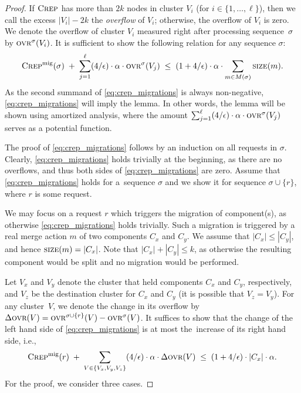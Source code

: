 \begin{proof}
If $\textsc{Crep}$ has more than $2 k$ nodes in cluster $V_i$ (for $i \in
\{1,\ldots,\ell\}$), then we call the excess $|V_i| - 2 k$ the \emph{overflow} of $V_i$;
otherwise, the overflow of $V_i$ is zero. We denote the overflow of cluster
$V_i$ measured right after processing sequence~$\sigma$ by $\textsc{ovr}^\sigma(V_i)$.
It is sufficient to show the following relation for any sequence $\sigma$:
\begin{equation}
\label{eq:crep_migrations}
 \textsc{Crep}^\textnormal{mig}(\sigma) \;+\; \sum_{j=1}^\ell (4/\epsilon) \cdot \alpha \cdot \textsc{ovr}^\sigma(V_j) 
 \; \leq \; (1+4/\epsilon)  \cdot \alpha \cdot \sum_{m \in M(\sigma)} \textsc{size}(m).
\end{equation}
As the second summand of \eqref{eq:crep_migrations} is always non-negative,
\eqref{eq:crep_migrations} will imply the lemma. 
In other words, the lemma will be shown using amortized analysis, where
the amount $\sum_{j=1}^\ell (4/\epsilon) \cdot \alpha \cdot \textsc{ovr}^\sigma(V_j)$ serves 
as a potential function.

The proof of \eqref{eq:crep_migrations} follows by an induction on all
requests in $\sigma$. Clearly, \eqref{eq:crep_migrations} holds trivially at the
beginning, as there are no overflows, and thus both sides of
\eqref{eq:crep_migrations} are zero. Assume that \eqref{eq:crep_migrations}
holds for a~sequence $\sigma$ and we show it for sequence $\sigma \cup \{ r \}$,
where $r$ is some request.

We may focus on a request $r$ which triggers the migration of
component(s), as otherwise
\eqref{eq:crep_migrations} holds trivially. Such a migration is triggered by a
real merge action $m$ of two components $C_x$ and $C_y$. We assume that $|C_x|
\leq |C_y|$, and hence $\textsc{size}(m) = |C_x|$. Note that $|C_x| + |C_y| \leq k$,
as otherwise the resulting component would be split and no migration would
be performed.

Let $V_x$ and $V_y$ denote the cluster that held components $C_x$ and $C_y$,
respectively, and $V_z$ be the destination cluster for $C_x$ and $C_y$ (it is
possible that $V_z = V_y$). For any cluster~$V$, we denote the change in 
its overflow by $\Delta \textsc{ovr}(V) = \textsc{ovr}^{\sigma \cup \{r\}}(V) - \textsc{ovr}^\sigma(V)$. 
It suffices to show that the
change of the left hand side of \eqref{eq:crep_migrations} is at most
the~increase of its right hand side, i.e.,
\begin{equation}
\label{eq:crep_mig_inc}
\textsc{Crep}^\textnormal{mig}(r) \;+\; \sum_{V \in \{ V_x, V_y, V_z \}} (4/\epsilon) \cdot \alpha \cdot \Delta\textsc{ovr}(V) 
\;\leq\; (1+4/\epsilon) \cdot |C_x| \cdot \alpha.
\end{equation}
For the proof, we consider three cases.


\end{proof}
